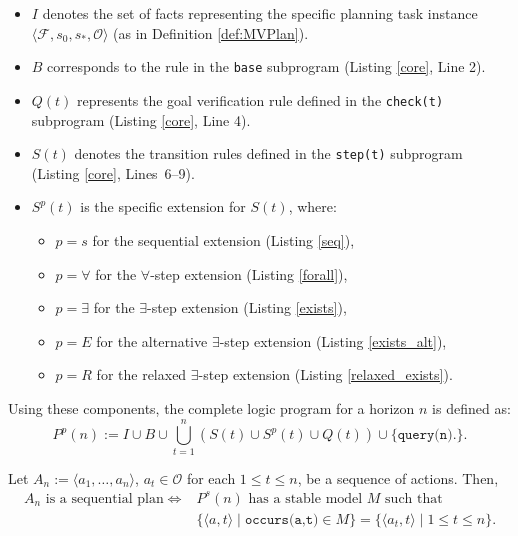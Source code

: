 \documentclass[
     11pt,                    %
     a4paper,             %
     BCOR=10mm,     %
     DIV=14,                 %
     listof=totoc,                    %
     bibliography=totoc,       %
     index=totoc,              %
     parskip            %
     twoside,
     headsepline
     ]{scrreprt}
\theoremstyle{definition}
\theoremstyle{definition}
\theoremstyle{remark}
\theoremstyle{bfnote}
\begin{document}
\begin{itemize}
  \item $I$ denotes the set of facts representing the specific planning task instance $\langle \mathcal{F}, s_0, s_*, \mathcal{O} \rangle$ (as in Definition \ref{def:MVPlan}).
  \item $B$ corresponds to the rule in the \texttt{base} subprogram (Listing \ref{core}, Line 2).
  \item $Q(t)$ represents the goal verification rule defined in the \texttt{check(t)} subprogram (Listing \ref{core}, Line 4).
  \item $S(t)$ denotes the transition rules defined in the \texttt{step(t)} subprogram (Listing \ref{core}, \mbox{Lines 6--9}).
  \item $S^p(t)$ is the specific extension for $S(t)$, where:
    \begin{itemize}
        \item $p = s$ for the sequential extension (Listing \ref{seq}),
        \item $p = \forall$ for the $\forall$-step extension (Listing \ref{forall}),
        \item $p = \exists$ for the $\exists$-step extension (Listing \ref{exists}),
        \item $p = E$ for the alternative $\exists$-step extension (Listing \ref{exists_alt}),
        \item $p = R$ for the relaxed $\exists$-step extension (Listing \ref{relaxed_exists}).
    \end{itemize}
\end{itemize}

Using these components, the complete logic program for a horizon $n$ is defined as:
\[
  P^p(n) := I \cup B \cup \bigcup_{t=1}^{n} \left( S(t) \cup S^p(t) \cup Q(t) \right) \cup \{ \texttt{query(n)}. \}.
\]


\begin{theo}
  \label{theo:1}
  Let $A_n := \langle a_1, \dots, a_n \rangle$, $a_t \in \mathcal{O}$ for each $1 \le t \le n$, be a sequence of actions. Then,
  \begin{align*}
      A_n \text{ is a sequential plan} \iff &P^s(n) \text{ has a stable model } M \text{ such that} \\
        &\{\langle a, t \rangle \mid \texttt{occurs(a,t)} \in M \} = \{\langle a_t, t \rangle \mid 1 \le t \le n \}.
  \end{align*}
\end{theo}
\end{document}
